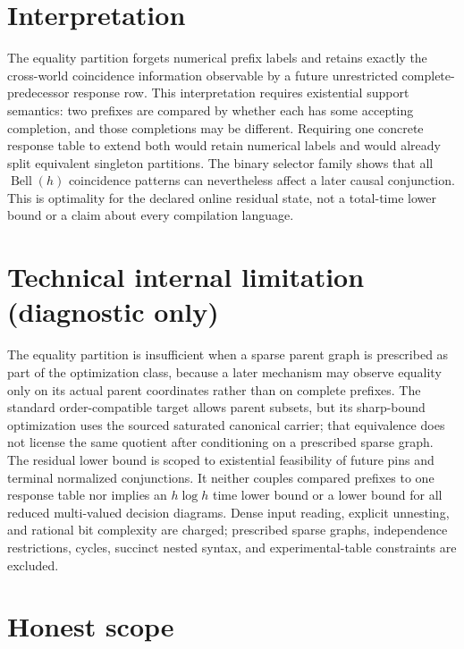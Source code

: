 \documentclass{article}
\begin{document}
\section{Interpretation}

The equality partition forgets numerical prefix labels and retains exactly the cross-world coincidence information observable by a future unrestricted complete-predecessor response row. This interpretation requires existential support semantics: two prefixes are compared by whether each has some accepting completion, and those completions may be different. Requiring one concrete response table to extend both would retain numerical labels and would already split equivalent singleton partitions. The binary selector family shows that all \(\operatorname{Bell}(h)\) coincidence patterns can nevertheless affect a later causal conjunction. This is optimality for the declared online residual state, not a total-time lower bound or a claim about every compilation language.

\section*{Technical internal limitation (diagnostic only)}

The equality partition is insufficient when a sparse parent graph is prescribed as part of the optimization class, because a later mechanism may observe equality only on its actual parent coordinates rather than on complete prefixes. The standard order-compatible target allows parent subsets, but its sharp-bound optimization uses the sourced saturated canonical carrier; that equivalence does not license the same quotient after conditioning on a prescribed sparse graph. The residual lower bound is scoped to existential feasibility of future pins and terminal normalized conjunctions. It neither couples compared prefixes to one response table nor implies an \(h\log h\) time lower bound or a lower bound for all reduced multi-valued decision diagrams. Dense input reading, explicit unnesting, and rational bit complexity are charged; prescribed sparse graphs, independence restrictions, cycles, succinct nested syntax, and experimental-table constraints are excluded.

\section{Honest scope}
\end{document}

